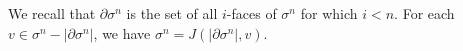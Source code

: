 We recall that $\partial \sigma^n$ is the set of all $i$-faces of $\sigma^n$ for which $i < n$. For each $v \in \sigma^n - |\partial \sigma^n|$, we have $\sigma^n = J(|\partial \sigma^n|, v)$.
